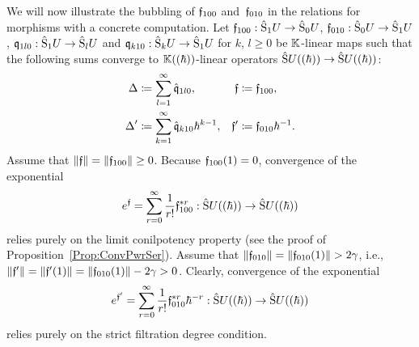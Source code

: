 \documentclass[\MainFolder/Text.tex]{subfiles}
\begin{document}
\begin{Example}
We will now illustrate the bubbling of $\mathfrak{f}_{100}$ and~$\mathfrak{f}_{010}$ in the relations for morphisms with a concrete computation. Let $\mathfrak{f}_{100}: \hat{\mathrm{S}}_1 U \rightarrow\hat{\mathrm{S}}_0 U$, $\mathfrak{f}_{010}: \hat{\mathrm{S}}_0 U \rightarrow \hat{\mathrm{S}}_1 U$, $\mathfrak{q}_{1l0}: \hat{\mathrm{S}}_1 U \rightarrow \hat{\mathrm{S}}_l U$ and $\mathfrak{q}_{k10}: \hat{\mathrm{S}}_k U \rightarrow \hat{\mathrm{S}}_1 U$ for $k$, $l\ge 0$ be $\mathbb{K}$-linear maps such that the following sums converge to $\mathbb{K}((\hbar))$-linear operators $\hat{\mathrm{S}}U((\hbar))\rightarrow\hat{\mathrm{S}}U((\hbar))$:
\begin{align*}
\operatorname{\Delta} &\coloneqq \sum_{l=1}^\infty \hat{\mathfrak{q}}_{1l0}, & \mathfrak{f}&\coloneqq \mathfrak{f}_{100}, \\
\operatorname{\Delta}'&\coloneqq \sum_{k=1}^\infty \hat{\mathfrak{q}}_{k10}\hbar^{k-1}, & \mathfrak{f}' &\coloneqq\mathfrak{f}_{010}\hbar^{-1}.
\end{align*}
Assume that $\| \mathfrak{f} \| = \| \mathfrak{f}_{100} \|\ge 0$. Because $\mathfrak{f}_{100}(1)=0$, convergence of the exponential
\[ e^{\mathfrak{f}} = \sum_{r=0}^\infty \frac{1}{r!}\mathfrak{f}_{100}^{* r}: \hat{\mathrm{S}}U((\hbar))\rightarrow\hat{\mathrm{S}}U((\hbar)) \]
relies purely on the limit conilpotency property (see the proof of Proposition~\ref{Prop:ConvPwrSer}). Assume that $\Norm{\HTP_{010}} = \Norm{\HTP_{010}(1)}>2\gamma$, i.e., $\| \mathfrak{f}' \| = \| \mathfrak{f}'(1) \| = \| \mathfrak{f}_{010}(1) \| - 2 \gamma >0$. Clearly, convergence of the exponential
\begin{equation}\label{Eq:ExpII}
e^{\mathfrak{f}'} = \sum_{r=0}^\infty \frac{1}{r!}\mathfrak{f}_{010}^{* r}\hbar^{-r}: \hat{\mathrm{S}}U((\hbar))\rightarrow\hat{\mathrm{S}}U((\hbar))
\end{equation}
relies purely on the strict filtration degree condition. 


\end{Example}
\end{document}

